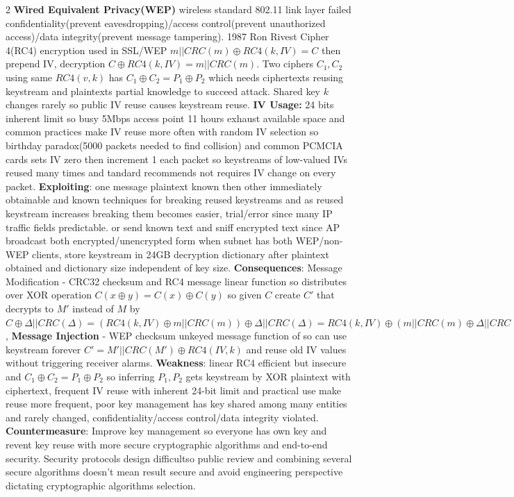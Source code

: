 \documentclass[9pt]{extarticle}
\begin{document}
\begin{multicols}{2}
\textbf{Wired Equivalent Privacy(WEP)} wireless standard 802.11 link layer failed confidentiality(prevent eavesdropping)/access control(prevent unauthorized access)/data integrity(prevent message tampering). 1987 Ron Rivest Cipher 4(RC4) encryption used in SSL/WEP $m||CRC(m)\oplus{RC4(k,IV)}=C$ then prepend IV, decryption $C\oplus{RC4(k,IV)}=m||CRC(m)$. Two ciphers $C_1,C_2$ using same $RC4(v,k)$ has $C_1\oplus{C_2}=P_1\oplus{P_2}$ which needs ciphertexts reusing keystream and plaintexts partial knowledge to succeed attack. Shared key $k$ changes rarely so public IV reuse causes keystream reuse. \textbf{IV Usage:} 24 bits inherent limit so busy 5Mbps access point 11 hours exhaust available space and common practices make IV reuse more often with random IV selection so birthday paradox(5000 packets needed to find collision) and common PCMCIA cards sets IV zero then increment 1 each packet so keystreams of low-valued IVs reused many times and tandard recommends not requires IV change on every packet. \textbf{Exploiting}: one message plaintext known then other immediately obtainable and known techniques for breaking reused keystreams and as reused keystream increases breaking them becomes easier, trial/error since many IP traffic fields predictable. or send known text and sniff encrypted text since AP broadcast both encrypted/unencrypted form when subnet has both WEP/non-WEP clients, store keystream in 24GB decryption dictionary after plaintext obtained and dictionary size independent of key size. \textbf{Consequences}: Message Modification - CRC32 checksum and RC4 message linear function so distributes over XOR operation $C(x\oplus{y})=C(x)\oplus{C(y)}$ so given $C$ create $C'$ that decrypts to $M'$ instead of $M$ by $C\oplus{\Delta||CRC(\Delta)}=(RC4(k,IV)\oplus{m||CRC(m)})\oplus{\Delta||CRC(\Delta)} = RC4(k,IV)\oplus({m||CRC(m)}\oplus{\Delta||CRC(\Delta)})= RC4(k,IV)\oplus{M'||CRC(M')}$, \textbf{Message Injection} - WEP checksum unkeyed message function of so can use keystream forever $C'=M'||CRC(M')\oplus{RC4(IV,k)}$ and reuse old IV values without triggering receiver alarms. \textbf{Weakness}: linear RC4 efficient but insecure and $C_1\oplus{C_2}=P_1\oplus{P_2}$ so inferring $P_1,P_2$ gets keystream by XOR plaintext with ciphertext, frequent IV reuse with inherent 24-bit limit and practical use make reuse more frequent, poor key management has key shared among many entities and rarely changed, confidentiality/access control/data integrity violated. \textbf{Countermeasure}: Improve key management so everyone has own key and revent key reuse with more secure cryptographic algorithms and end-to-end security. Security protocols design difficultso public review and combining several secure algorithms doesn't mean result secure and avoid engineering perspective dictating cryptographic algorithms selection.


\end{multicols}
\end{document}
